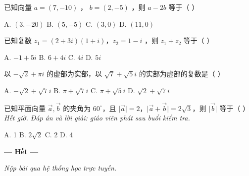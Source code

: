 \documentclass[11pt, a4paper]{article}
\begin{document}
\begin{baitap}[21]
已知向量 $a = (7,-10)$ ， $b = (2,-5)$ ，则 $a - 2b$ 等于（ ）
\par\vspace{3pt}
\noindent A. $(3,-20)$ \quad B. $(5,-5)$ \quad C. $(3,0)$ \quad D. $(11,0)$
\end{baitap}

\begin{baitap}[22]
已知复数 $z_1 = (2 + 3i)(1 + i)$，$z_2 = 1 - i$ ，则 $z_1 + z_2$ 等于（ ）
\par\vspace{3pt}
\noindent A. $-1 + 5i$ \quad B. $6 + 4i$ \quad C. $4i$ \quad D. $5i$
\end{baitap}

\begin{baitap}[23]
以 $-\sqrt{2} + \pi i$ 的虚部为实部，以 $\sqrt{7} + \sqrt{5}i$ 的实部为虚部的复数是（ ）
\par\vspace{3pt}
\noindent A. $-\sqrt{2} + \sqrt{7}i$ \quad B. $\pi + \sqrt{7}i$ \quad C. $\pi + \sqrt{5}i$ \quad D. $\sqrt{2} + \sqrt{7}i$
\end{baitap}

\begin{baitap}[24]
已知平面向量 $\vec{a}, \vec{b}$ 的夹角为 $60^\circ$，且 $\lvert\vec{a}\rvert = 2$，$\lvert\vec{a} + \vec{b}\rvert = 2\sqrt{3}$，则 $\lvert\vec{b}\rvert$ 等于（ ） \emph{Hết giờ. Đáp án và lời giải: giáo viên phát sau buổi kiểm tra.}
\par\vspace{3pt}
\noindent A. 1 \quad B. $2\sqrt{2}$ \quad C. 2 \quad D. 4
\end{baitap}

\vspace{0.5cm}
\begin{center}
\textbf{--- Hết ---}
\end{center}

\vspace{0.3cm}
\noindent\emph{Nộp bài qua hệ thống học trực tuyến.}
\end{document}
